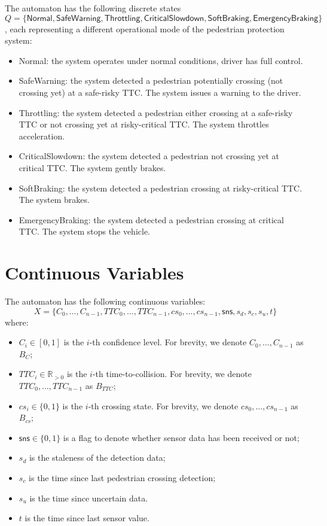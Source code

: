 \documentclass[12pt]{article}
\theoremstyle{definition}
\begin{document}
The automaton has the following discrete states 
\[Q = \{\mathsf{Normal}, \mathsf{SafeWarning}, \mathsf{Throttling}, \mathsf{CriticalSlowdown}, \mathsf{SoftBraking}, \mathsf{EmergencyBraking} \}\],
each representing a different operational mode of the pedestrian protection system:
\begin{itemize}
    \item Normal: the system operates under normal conditions, driver has full control.
    \item SafeWarning: the system detected a pedestrian potentially crossing (not crossing yet) at a safe-risky TTC. The system issues a warning to the driver.
    \item Throttling: the system detected a pedestrian either crossing at a safe-risky TTC or not crossing yet at risky-critical TTC. The system throttles acceleration.
    \item CriticalSlowdown: the system detected a pedestrian not crossing yet at critical TTC. The system gently brakes.
    \item SoftBraking: the system detected a pedestrian crossing at risky-critical TTC. The system brakes.
    \item EmergencyBraking: the system detected a pedestrian crossing at critical TTC. The system stops the vehicle.
\end{itemize}

\section{Continuous Variables}

The automaton has the following continuous variables:
\[X = \{C_0, \ldots, C_{n-1}, TTC_0, \ldots, TTC_{n-1}, cs_0, \ldots, cs_{n-1}, \mathsf{sns}, s_d, s_c, s_u, t\}\]
where:
\begin{itemize}
    \item $C_i \in [0,1]$ is the $i$-th confidence level. For brevity, we denote $C_0, \ldots, C_{n-1}$ as $B_C$;
    \item $TTC_i \in \mathbb{R}_{>0}$ is the $i$-th time-to-collision. For brevity, we denote $TTC_0, \ldots, TTC_{n-1}$ as $B_{TTC}$;
    \item $cs_i \in \{0,1\}$ is the $i$-th crossing state. For brevity, we denote $cs_0, \ldots, cs_{n-1}$ as $B_{cs}$;
    \item $\mathsf{sns} \in \{0,1\} $ is a flag to denote whether sensor data has been received or not;
    \item $s_d$ is the staleness of the detection data;
    \item $s_c$ is the time since last pedestrian crossing detection;
    \item $s_u$ is the time since uncertain data.
    \item $t$ is the time since last sensor value.
\end{itemize}
\end{document}
